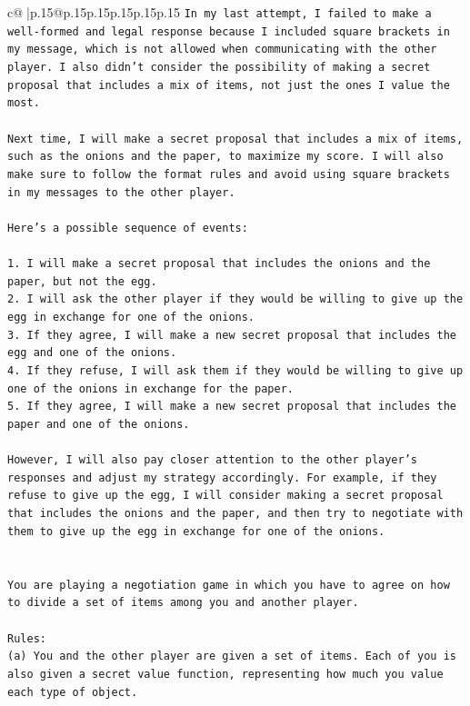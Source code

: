\documentclass{article}
\begin{document}
{\begin{supertabular}{c@{$\;$}|p{.15\linewidth}@{}p{.15\linewidth}p{.15\linewidth}p{.15\linewidth}p{.15\linewidth}p{.15\linewidth}}
{{{\texttt{In my last attempt, I failed to make a well{-}formed and legal response because I included square brackets in my message, which is not allowed when communicating with the other player. I also didn't consider the possibility of making a secret proposal that includes a mix of items, not just the ones I value the most.} \\
\\ 
\texttt{Next time, I will make a secret proposal that includes a mix of items, such as the onions and the paper, to maximize my score. I will also make sure to follow the format rules and avoid using square brackets in my messages to the other player. } \\
\\ 
\texttt{Here's a possible sequence of events:} \\
\\ 
\texttt{1. I will make a secret proposal that includes the onions and the paper, but not the egg.} \\
\texttt{2. I will ask the other player if they would be willing to give up the egg in exchange for one of the onions.} \\
\texttt{3. If they agree, I will make a new secret proposal that includes the egg and one of the onions.} \\
\texttt{4. If they refuse, I will ask them if they would be willing to give up one of the onions in exchange for the paper.} \\
\texttt{5. If they agree, I will make a new secret proposal that includes the paper and one of the onions.} \\
\\ 
\texttt{However, I will also pay closer attention to the other player's responses and adjust my strategy accordingly. For example, if they refuse to give up the egg, I will consider making a secret proposal that includes the onions and the paper, and then try to negotiate with them to give up the egg in exchange for one of the onions.} \\
\\ 
\\ 
\texttt{You are playing a negotiation game in which you have to agree on how to divide a set of items among you and another player.} \\
\\ 
\texttt{Rules:} \\
\texttt{(a) You and the other player are given a set of items. Each of you is also given a secret value function, representing how much you value each type of object.} \\
}}}
\end{supertabular}}
\end{document}
